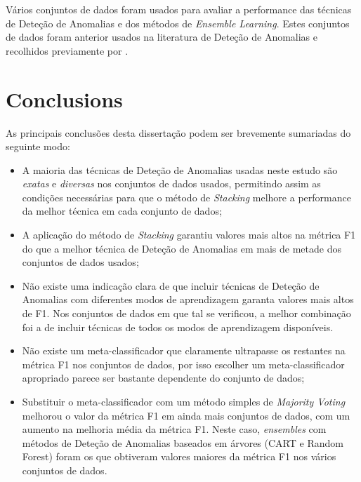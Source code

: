\documentclass[9pt,a4paper]{extarticle}
\begin{document}
\begin{multicols}{2}
		Vários conjuntos de dados foram usados para avaliar a performance das técnicas de Deteção de Anomalias e dos métodos de \textit{Ensemble Learning}. Estes conjuntos de dados foram anterior usados na literatura de Deteção de Anomalias e recolhidos previamente por \textcite{Campos2016}.
		
		\section{Conclusions}\label{sec:conclui}
		
		As principais conclusões desta dissertação podem ser brevemente sumariadas do seguinte modo:
		
		\begin{itemize}	
			\item A maioria das técnicas de Deteção de Anomalias usadas neste estudo são \textit{exatas} e \textit{diversas} nos conjuntos de dados usados, permitindo assim as condições necessárias para que o método de \textit{Stacking} melhore a performance da melhor técnica em cada conjunto de dados;
			
			\item A aplicação do método de \textit{Stacking} garantiu valores mais altos na métrica F1 do que a melhor técnica de Deteção de Anomalias em mais de metade dos conjuntos de dados usados;
			
			\item Não existe uma indicação clara de que incluir técnicas de Deteção de Anomalias com diferentes modos de aprendizagem garanta valores mais altos de F1. Nos conjuntos de dados em que tal se verificou, a melhor combinação foi a de incluir técnicas de todos os modos de aprendizagem disponíveis.
			
			\item Não existe um meta-classificador que claramente ultrapasse os restantes na métrica F1 nos conjuntos de dados, por isso escolher um meta-classificador apropriado parece ser bastante dependente do conjunto de dados;
			
			\item Substituir o meta-classificador com um método simples de \textit{Majority Voting} melhorou o valor da métrica F1 em ainda mais conjuntos de dados, com um aumento na melhoria média da métrica F1. Neste caso, \textit{ensembles} com métodos de Deteção de Anomalias baseados em árvores (CART e Random Forest) foram os que obtiveram valores maiores da métrica F1 nos vários conjuntos de dados.
		\end{itemize}
		
		
		\printbibliography
		
	\end{multicols}
	
\end{document}
